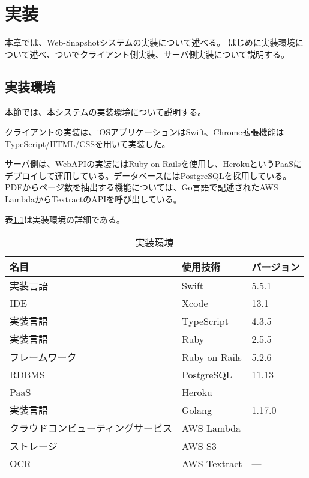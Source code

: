 \chapter{実装}
\label{chap:implementation}
本章では、Web-Snapshotシステムの実装について述べる。
はじめに実装環境について述べ、ついでクライアント側実装、サーバ側実装について説明する。

\section{実装環境}
本節では、本システムの実装環境について説明する。

クライアントの実装は、iOSアプリケーションはSwift、Chrome拡張機能はTypeScript/HTML/CSSを用いて実装した。

サーバ側は、WebAPIの実装にはRuby on Railsを使用し、Heroku\cite{}というPaaSにデプロイして運用している。データベースにはPostgreSQLを採用している。
PDFからページ数を抽出する機能については、Go言語で記述されたAWS LambdaからTextract\cite{}のAPIを呼び出している。

表\ref{tb:implementation-env}は実装環境の詳細である。

\begin{table}[htbp]
  \label{tb:implementation-env}
  \caption{実装環境}
  \begin{center}
    \begin{tabular}{|l|l|l|}
    \hline
    名目 & 使用技術 & バージョン \\ \hline
    実装言語 & Swift & 5.5.1 \\ \hline
    IDE & Xcode & 13.1 \\ \hline
    実装言語 & TypeScript & 4.3.5 \\ \hline
    実装言語 & Ruby & 2.5.5 \\ \hline
    フレームワーク & Ruby on Rails & 5.2.6 \\ \hline
    RDBMS & PostgreSQL & 11.13 \\ \hline
    PaaS & Heroku & --- \\ \hline
    実装言語 & Golang & 1.17.0 \\ \hline
    クラウドコンピューティングサービス & AWS Lambda & --- \\ \hline
    ストレージ & AWS S3 & --- \\ \hline
    OCR & AWS Textract & --- \\ \hline
    \end{tabular}
  \end{center}
\end{table}





